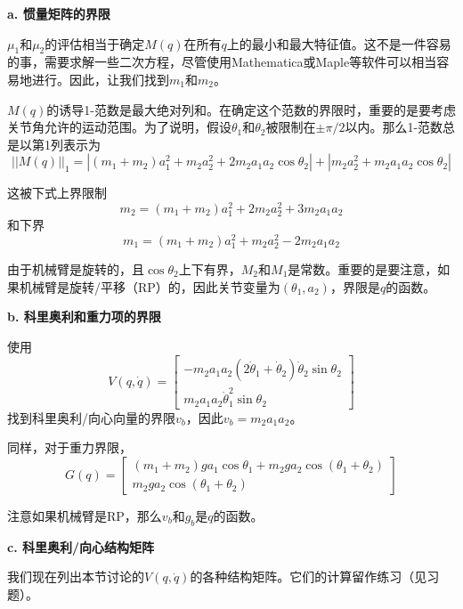 \documentclass[12pt,a4paper]{ctexart}
\begin{document}
\textbf{a. 惯量矩阵的界限}

$\mu_1$和$\mu_2$的评估相当于确定$M(q)$在所有$q$上的最小和最大特征值。这不是一件容易的事，需要求解一些二次方程，尽管使用Mathematica或Maple等软件可以相当容易地进行。因此，让我们找到$m_1$和$m_2$。

$M(q)$的诱导1-范数是最大绝对列和。在确定这个范数的界限时，重要的是要考虑关节角允许的运动范围。为了说明，假设$\theta_1$和$\theta_2$被限制在$\pm\pi/2$以内。那么1-范数总是以第1列表示为
\begin{equation}
||M(q)||_1 = |(m_1+m_2)a_1^2 + m_2a_2^2 + 2m_2a_1a_2\cos\theta_2| + |m_2a_2^2 + m_2a_1a_2\cos\theta_2|
\end{equation}

这被下式上界限制
\begin{equation}
m_2 = (m_1+m_2)a_1^2 + 2m_2a_2^2 + 3m_2a_1a_2
\end{equation}
和下界
\begin{equation}
m_1 = (m_1+m_2)a_1^2 + m_2a_2^2 - 2m_2a_1a_2
\end{equation}

由于机械臂是旋转的，且$\cos\theta_2$上下有界，$M_2$和$M_1$是常数。重要的是要注意，如果机械臂是旋转/平移（RP）的，因此关节变量为$(\theta_1, a_2)$，界限是$q$的函数。

\textbf{b. 科里奥利和重力项的界限}

使用
\begin{equation}
V(q,\dot{q}) = \begin{bmatrix} -m_2a_1a_2(2\dot{\theta}_1+\dot{\theta}_2)\dot{\theta}_2\sin\theta_2 \\ m_2a_1a_2\dot{\theta}_1^2\sin\theta_2 \end{bmatrix}
\end{equation}
找到科里奥利/向心向量的界限$v_b$，因此$v_b = m_2a_1a_2$。

同样，对于重力界限，
\begin{equation}
G(q) = \begin{bmatrix} (m_1+m_2)ga_1\cos\theta_1 + m_2ga_2\cos(\theta_1+\theta_2) \\ m_2ga_2\cos(\theta_1+\theta_2) \end{bmatrix}
\end{equation}

注意如果机械臂是RP，那么$v_b$和$g_b$是$q$的函数。

\textbf{c. 科里奥利/向心结构矩阵}

我们现在列出本节讨论的$V(q,\dot{q})$的各种结构矩阵。它们的计算留作练习（见习题）。
\end{document}
